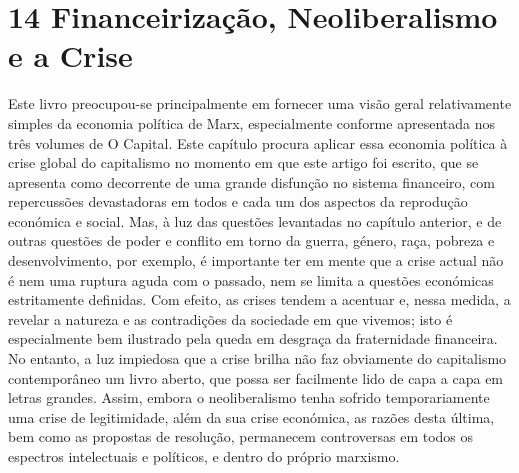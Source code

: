 \chapter{14 Financeirização, Neoliberalismo e a Crise}\label{14 Financeirização, Neoliberalismo e a Crise}
 \par 
Este livro preocupou-se principalmente em fornecer uma visão geral relativamente simples da economia política de Marx, especialmente conforme apresentada nos três volumes de O Capital. Este capítulo procura aplicar essa economia política à crise global do capitalismo no momento em que este artigo foi escrito, que se apresenta como decorrente de uma grande disfunção no sistema financeiro, com repercussões devastadoras em todos e cada um dos aspectos da reprodução económica e social. Mas, à luz das questões levantadas no capítulo anterior, e de outras questões de poder e conflito em torno da guerra, género, raça, pobreza e desenvolvimento, por exemplo, é importante ter em mente que a crise actual não é nem uma ruptura aguda com o passado, nem se limita a questões económicas estritamente definidas. Com efeito, as crises tendem a acentuar e, nessa medida, a revelar a natureza e as contradições da sociedade em que vivemos; isto é especialmente bem ilustrado pela queda em desgraça da fraternidade financeira. No entanto, a luz impiedosa que a crise brilha não faz obviamente do capitalismo contemporâneo um livro aberto, que possa ser facilmente lido de capa a capa em letras grandes. Assim, embora o neoliberalismo tenha sofrido temporariamente uma crise de legitimidade, além da sua crise económica, as razões desta última, bem como as propostas de resolução, permanecem controversas em todos os espectros intelectuais e políticos, e dentro do próprio marxismo.
 \par 
